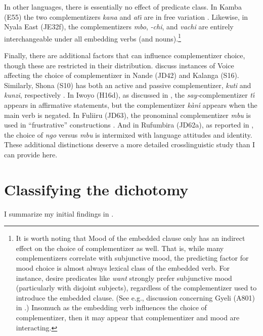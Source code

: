 \documentclass[output=paper,colorlinks,citecolor=brown,
]{langscibook}
\begin{document}
In other languages, there is essentially no effect of predicate class. In Kamba (E55)  the two complementizers \textit{kana} and \textit{at\~\i} are in free variation \citep[187]{Myers:1975}. Likewise, in Nyala East (JE32f), the complementizers \textit{mbo}, \textit{-chi}, and \textit{vachi} are entirely interchangeable under all embedding verbs (and nouns).\footnote{It is worth noting that Mood of the embedded clause only has an indirect effect on the choice of complementizer as well. That is, while many complementizers correlate with subjunctive mood, the predicting factor for mood choice is almost always lexical class of the embedded verb. For instance, desire predicates like \textit{want} strongly prefer subjunctive mood (particularly with disjoint subjects), regardless of the complementizer used to introduce the embedded clause.  (See e.g., discussion concerning Gyeli (A801) in \citealt{Grimm:2021}.) Insomuch as the embedding verb  influences the choice of complementizer, then it may appear that complementizer and mood are interacting.} 
 
 Finally, there are additional factors that can influence complementizer choice, though these are restricted in their distribution. \citet{LetsholoSafir:2019} discuss instances of Voice affecting the choice of complementizer in Nande (JD42) and Kalanga (S16). Similarly, Shona (S10) has both an active and passive complementizer, \textit{kuti} and \textit{kunzi}, respectively \citep{Dembetembe:1976}.  In Iwoyo (H16d), as discussed in \citet{Mingas:1994}, the \textit{say-}complementizer \textit{t\'\i} appears in affirmative statements, but the complementizer \textit{k\`an\'\i} appears when the main verb is negated. In Fuliiru (JD63), the pronominal complementizer \textit{mbu} is used in ``frustrative'' constructions \citep{Otterloo:2011}. And in Rufumbira (JD62a), as reported in \citet{Nassenstein:2016}, the choice of \textit{ngo} versus \textit{mbu} is intermixed with language attitudes and identity.  These additional distinctions deserve a more detailed crosslinguistic study than I can provide here.



\section{Classifying the dichotomy}\label{sec:gluckman:analysissection}

I summarize my initial findings in .
\end{document}

